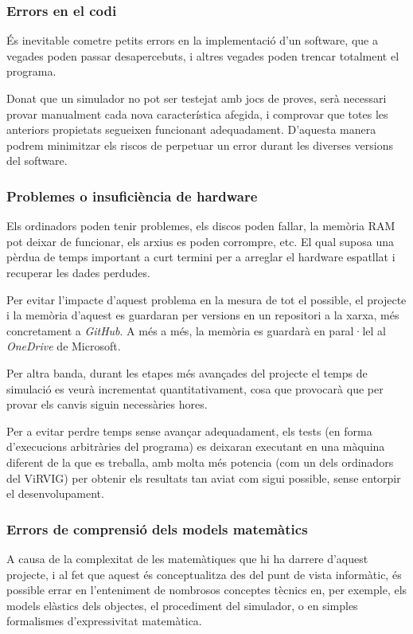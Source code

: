\documentclass[a4paper]{report}
\begin{document}
	\subsubsection{Errors en el codi}
	És inevitable cometre petits errors en la implementació d'un software, que a vegades poden passar desapercebuts, i altres vegades poden trencar totalment el programa.\par
	Donat que un simulador no pot ser testejat amb jocs de proves, serà necessari provar manualment cada nova característica afegida, i comprovar que totes les anteriors propietats segueixen funcionant adequadament. D'aquesta manera podrem minimitzar els riscos de perpetuar un error durant les diverses versions del software.
	\subsubsection{Problemes o insuficiència de hardware}
	Els ordinadors poden tenir problemes, els discos poden fallar, la memòria RAM pot deixar de funcionar, els arxius es poden corrompre, etc. El qual suposa una pèrdua de temps important a curt termini per a arreglar el hardware espatllat i recuperar les dades perdudes. \par
	Per evitar l'impacte d'aquest problema en la mesura de tot el possible, el projecte i la memòria d'aquest es guardaran per versions en un repositori a la xarxa, més concretament a \textit{GitHub}. A més a més, la memòria es guardarà en paral·lel al \textit{OneDrive} de Microsoft.
	\par
	Per altra banda, durant les etapes més avançades del projecte el temps de simulació es veurà incrementat quantitativament, cosa que provocarà que per provar els canvis siguin necessàries hores. \par
	Per a evitar perdre temps sense avançar adequadament, els tests (en forma d'execucions arbitràries del programa) es deixaran executant en una màquina diferent de la que es treballa, amb molta més potencia (com un dels ordinadors del ViRVIG) per obtenir els resultats tan aviat com sigui possible, sense entorpir el desenvolupament.
	\subsubsection{Errors de comprensió dels models matemàtics}
	A causa de la complexitat de les matemàtiques que hi ha darrere d'aquest projecte, i al fet que aquest és conceptualitza des del punt de vista informàtic, és possible errar en l'enteniment de nombrosos conceptes tècnics en, per exemple, els models elàstics dels objectes, el procediment del simulador, o en simples formalismes d'expressivitat matemàtica. 
\end{document}
